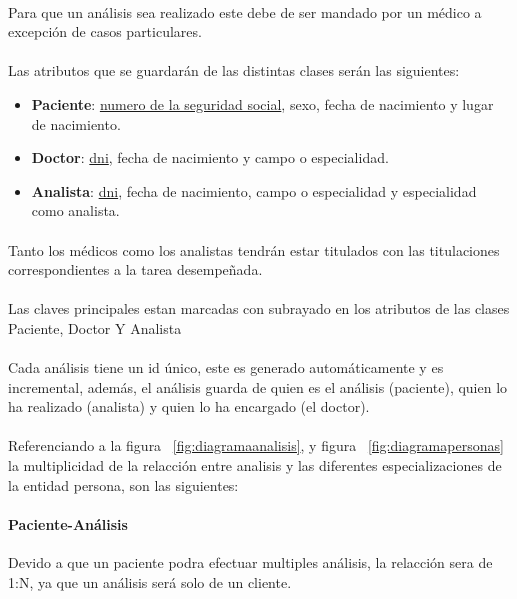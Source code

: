 \documentclass[a4paper,10pt]{article}
\begin{document}
\paragraph{}
Para que un análisis sea realizado este debe de ser mandado por un médico a excepción de casos particulares.
\paragraph{}
Las atributos que se guardarán de las distintas clases serán las siguientes:
\begin{itemize}
	\item {\bf Paciente}: \underline{numero de la seguridad social}, sexo, fecha de nacimiento y lugar de nacimiento.
	\item {\bf Doctor}: \underline{dni}, fecha de nacimiento y campo o especialidad.
	\item {\bf Analista}: \underline{dni}, fecha de nacimiento, campo o especialidad y especialidad como analista.
\end{itemize}
\paragraph{}
Tanto los médicos como los analistas tendrán estar titulados con las titulaciones correspondientes a la tarea desempeñada.
\paragraph{}
Las claves principales estan marcadas con subrayado en los atributos de las clases Paciente, Doctor Y Analista
\paragraph{}
Cada análisis tiene un id único, este es generado automáticamente y es incremental, además, el análisis guarda de quien es el análisis (paciente), quien lo ha realizado (analista) y quien lo ha encargado (el doctor).
\paragraph{}
Referenciando a la figura ~\ref{fig:diagramaanalisis}, y figura ~\ref{fig:diagramapersonas} la multiplicidad de la relacción entre analisis y las diferentes especializaciones de la entidad persona, son las siguientes:
\paragraph{Paciente-Análisis}
Devido a que un paciente podra efectuar multiples análisis, la relacción sera de 1:N, ya que un análisis será solo de un cliente.
\end{document}
